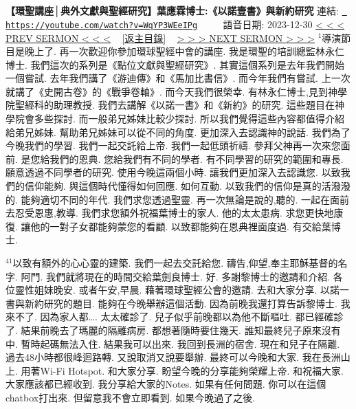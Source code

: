 \documentclass{book}
\begin{document}
\section{}
\label{sec:WqYP3WEeIPg}
\textbf{【環聖講座│典外文獻與聖經研究】葉應霖博士:《以諾壹書》與新約研究}
\newline
\newline
連結: \href{https://youtube.com/watch?v=WqYP3WEeIPg}{\texttt{ https://youtube.com/watch?v=WqYP3WEeIPg}} ~~~~ 語音日期: 2023-12-30 
\newline
\newline
\hyperref[sec:kGnhU90Nb7o]{\small{< < < PREV SERMON < < <}}
~
\hyperref[sec:index]{\small{[返主目錄]}}
~
\hyperref[sec:svj043qXB24]{\small{> > > NEXT SERMON > > >}}
\newline
\newline
$^{1}$導演節目是晚上了.
再一次歡迎你參加環球聖經中會的講座.
我是環聖的培訓總監林永仁博士.
我們這次的系列是《點位文獻與聖經研究》.
其實這個系列是去年我們開始一個嘗試.
去年我們講了《游迪傳》和《馬加比書信》.
而今年我們有嘗試.
上一次就講了《史開古卷》的《戰爭卷軸》.
而今天我們很榮幸.
有林永仁博士,見到神學院聖經科的助理教授.
我們去講解《以諾一書》和《新約》的研究.
這些題目在神學院會多些探討.
而一般弟兄姊妹比較少探討.
所以我們覺得這些內容都值得介紹給弟兄姊妹.
幫助弟兄姊妹可以從不同的角度.
更加深入去認識神的說話.
我們為了今晚我們的學習.
我們一起交託給上帝.
我們一起低頭祈禱.
參拜父神再一次來您面前.
是您給我們的恩典.
您給我們有不同的學者.
有不同學習的研究的範圍和專長.
願意透過不同學者的研究.
使用今晚這兩個小時.
讓我們更加深入去認識您.
以致我們的信仰能夠.
與這個時代懂得如何回應.
如何互動.
以致我們的信仰是真的活潑潑的.
能夠適切不同的年代.
我們求您透過聖靈.
再一次無論是說的,聽的.
一起在面前去忍受恩惠,教導.
我們求您額外祝福葉博士的家人.
他的太太患病.
求您更快地康復.
讓他的一對子女都能夠蒙您的看顧.
以致都能夠在恩典裡面度過.
有交給葉博士.

$^{41}$以致有額外的心心靈的建築.
我們一起去交託給您.
禱告,仰望,奉主耶穌基督的名字.
阿門.
我們就將現在的時間交給葉劍良博士.
好.
多謝黎博士的邀請和介紹.
各位靈性姐妹晚安.
或者午安,早晨.
藉著環球聖經公會的邀請.
去和大家分享.
以諾一書與新約研究的題目.
能夠在今晚舉辦這個活動.
因為前晚我還打算告訴黎博士.
我來不了.
因為家人都….
太太確診了.
兒子似乎前晚都以為他不斷嘔吐.
都已經確診了.
結果前晚去了瑪麗的隔離病房.
都想著隨時要住幾天.
誰知最終兒子原來沒有中.
暫時起碼無法入住.
結果我可以出來.
我回到長洲的宿舍.
現在和兒子在隔離.
過去48小時都很峰迴路轉.
又說取消又說要舉辦.
最終可以今晚和大家.
我在長洲山上.
用著Wi-Fi Hotspot.
和大家分享.
盼望今晚的分享能夠榮耀上帝.
和祝福大家.
大家應該都已經收到.
我分享給大家的Notes.
如果有任何問題.
你可以在這個chatbox打出來.
但留意我不會立即看到.
如果今晚過了之後.
\end{document}
